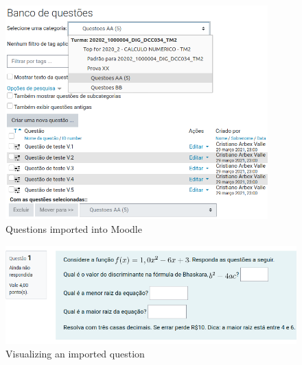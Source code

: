 \documentclass[11pt]{article}
\begin{document}
\begin{figure}[!htb]
\centering
  \includegraphics[width=0.9\textwidth]{figures/questoes.png}
  \caption{Questions imported into Moodle}
  \label{fig2}
\end{figure}


\begin{figure}[!htb]
\centering
  \includegraphics[width=1\textwidth]{figures/exemplo.png}
  \caption{Visualizing an imported question}
  \label{fig3}
\end{figure}
\end{document}
